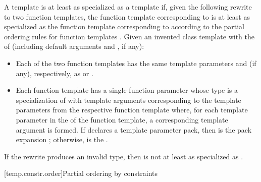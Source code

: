 \documentclass{wg21}
\begin{document}
\pnum
A template   is
at least as specialized as a template  
if, given the following rewrite to two function templates,
the function template corresponding to 
is at least as specialized as
the function template corresponding to 
according to the partial ordering rules
for function templates .
Given an invented class template 
with the  of  (including default arguments
and , if any):

\begin{itemize}
    \item
    Each of the two function templates has the same template parameters
    and  (if any),
    respectively, as  or .
    \item
    Each function template has a single function parameter
    whose type is a specialization of 
    with template arguments corresponding to the template parameters
    from the respective function template where,
    for each template parameter 
    in the  of the function template,
    a corresponding template argument  is formed.
    If  declares a template parameter pack,
    then  is the pack expansion  ;
    otherwise,  is the  .
\end{itemize}
If the rewrite produces an invalid type,
then  is not at least as specialized as .


[temp.constr.order]{Partial ordering by constraints}
\end{document}
